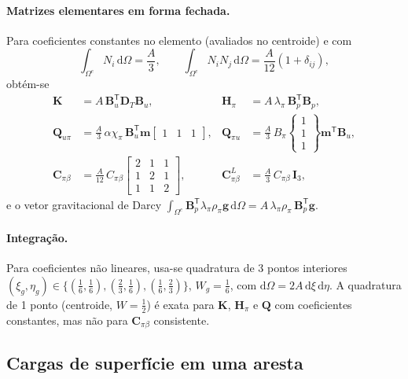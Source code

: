 \documentclass[11pt,a4paper]{article}
\newcommand{\dd}{\mathrm{d}}
\begin{document}
\paragraph{Matrizes elementares em forma fechada.} Para coeficientes
constantes no elemento (avaliados no centroide) e com
\begin{equation*}
\int_{\Omega^e}N_i\,\dd\Omega=\frac A3,\qquad
\int_{\Omega^e}N_iN_j\,\dd\Omega=\frac{A}{12}(1+\delta_{ij}),
\end{equation*}
obtém-se
\begin{align*}
\mathbf K&=A\,\mathbf B_u^{\mathsf T}\mathbf D_T\mathbf B_u, &
\mathbf H_\pi&=A\,\lambda_\pi\,\mathbf B_p^{\mathsf T}\mathbf B_p,\\
\mathbf Q_{u\pi}&=\frac A3\,\alpha\chi_\pi\,\mathbf B_u^{\mathsf T}\mathbf m
\begin{bmatrix}1&1&1\end{bmatrix}, &
\mathbf Q_{\pi u}&=\frac A3\,B_\pi
\begin{Bmatrix}1\\1\\1\end{Bmatrix}\mathbf m^{\mathsf T}\mathbf B_u,\\
\mathbf C_{\pi\beta}&=\frac{A}{12}\,C_{\pi\beta}
\begin{bmatrix}2&1&1\\1&2&1\\1&1&2\end{bmatrix}, &
\mathbf C_{\pi\beta}^{L}&=\frac A3\,C_{\pi\beta}\,\mathbf I_3,
\end{align*}
e o vetor gravitacional de Darcy
$\int_{\Omega^e}\mathbf B_p^{\mathsf T}\lambda_\pi\rho_\pi\mathbf g\,\dd\Omega
=A\,\lambda_\pi\rho_\pi\,\mathbf B_p^{\mathsf T}\mathbf g$.

\paragraph{Integração.} Para coeficientes não lineares, usa-se
quadratura de 3 pontos interiores
$(\xi_g,\eta_g)\in\{(\tfrac16,\tfrac16),(\tfrac23,\tfrac16),(\tfrac16,\tfrac23)\}$,
$W_g=\tfrac16$, com $\dd\Omega=2A\,\dd\xi\,\dd\eta$. A quadratura de
1 ponto (centroide, $W=\tfrac12$) é exata para $\mathbf K$, $\mathbf H_\pi$ e $\mathbf Q$
com coeficientes constantes, mas não para $\mathbf C_{\pi\beta}$ consistente.

\subsection{Cargas de superfície em uma aresta}
\end{document}

